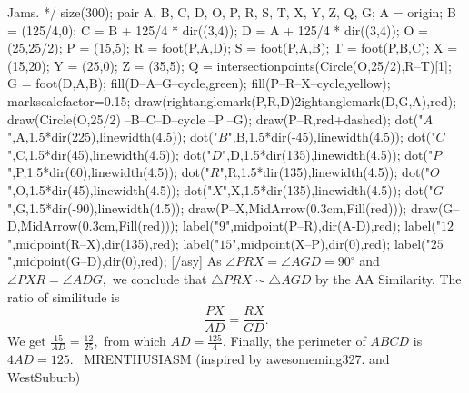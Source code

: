 \documentclass[12pt]{article}
\begin{document}
Jams. */ size(300); pair A, B, C, D, O, P, R, S, T, X, Y, Z, Q, G; A = origin; B = (125/4,0); C = B + 125/4 * dir((3,4)); D = A + 125/4 * dir((3,4)); O = (25,25/2); P = (15,5); R = foot(P,A,D); S = foot(P,A,B); T = foot(P,B,C); X = (15,20); Y = (25,0); Z = (35,5); Q = intersectionpoints(Circle(O,25/2),R--T)[1]; G = foot(D,A,B); fill(D--A--G--cycle,green); fill(P--R--X--cycle,yellow); markscalefactor=0.15; draw(rightanglemark(P,R,D)^^rightanglemark(D,G,A),red); draw(Circle(O,25/2)^^A--B--C--D--cycle^^X--P^^D--G); draw(P--R,red+dashed); dot("$A$",A,1.5*dir(225),linewidth(4.5)); dot("$B$",B,1.5*dir(-45),linewidth(4.5)); dot("$C$",C,1.5*dir(45),linewidth(4.5)); dot("$D$",D,1.5*dir(135),linewidth(4.5)); dot("$P$",P,1.5*dir(60),linewidth(4.5)); dot("$R$",R,1.5*dir(135),linewidth(4.5)); dot("$O$",O,1.5*dir(45),linewidth(4.5)); dot("$X$",X,1.5*dir(135),linewidth(4.5)); dot("$G$",G,1.5*dir(-90),linewidth(4.5)); draw(P--X,MidArrow(0.3cm,Fill(red))); draw(G--D,MidArrow(0.3cm,Fill(red))); label("$9$",midpoint(P--R),dir(A-D),red); label("$12$",midpoint(R--X),dir(135),red); label("$15$",midpoint(X--P),dir(0),red); label("$25$",midpoint(G--D),dir(0),red); [/asy] As $\angle PRX = \angle AGD = 90^\circ$ and $\angle PXR = \angle ADG,$ we conclude that $\triangle PRX \sim \triangle AGD$ by the AA Similarity. The ratio of similitude is \[\frac{PX}{AD} = \frac{RX}{GD}.\] We get $\frac{15}{AD} = \frac{12}{25},$ from which $AD = \frac{125}{4}.$ Finally, the perimeter of $ABCD$ is $4AD = \boxed{125}.$ ~MRENTHUSIASM (inspired by awesomeming327. and WestSuburb)
\end{document}
